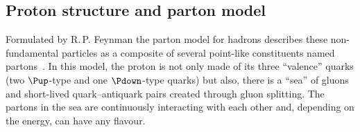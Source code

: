 

\subsection{Proton structure and parton model}
\label{sec:Chap2:PhenoOfPP:ProtonStructure}

Formulated by R.$\,$P. Feynman the parton model for hadrons describes these non-fundamental 
particles as a composite of several point-like constituents named partons~\cite{Feynman:1969ej}.
In this model, the proton is not only made of its three ``valence''  quarks 
(two $\Pup$-type and one $\Pdown$-type quarks) but also, there is a ``sea'' of
gluons and short-lived quark--antiquark pairs created through gluon splitting.
The partons in the sea are continuously interacting with each other and, depending
on the energy, can have any flavour.




